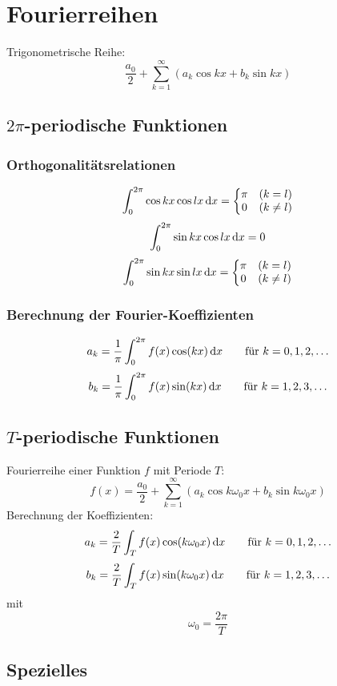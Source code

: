 \chapter{Fourierreihen}
Trigonometrische Reihe:
\[ \frac{a_0}{2} + \sum_{k=1}^{\infty}\left( a_k\cos kx + b_k\sin kx \right) \]

\section{$2\pi$-periodische Funktionen}
\subsection{Orthogonalitätsrelationen}
\[ \int_{0}^{2\pi}\cos kx\cos lx\,\mathrm{d} x = \left\lbrace \begin{matrix}
	\pi & (k=l) \\ 0 & (k\neq l) \end{matrix} \right. \]
\[ \int_{0}^{2\pi}\sin kx\cos lx\,\mathrm{d} x = 0 \]
\[ \int_{0}^{2\pi}\sin kx\sin lx\,\mathrm{d} x = \left\lbrace \begin{matrix}
	\pi & (k=l) \\ 0 & (k\neq l) \end{matrix} \right. \]
	
\subsection{Berechnung der Fourier-Koeffizienten}
\[ a_k = \frac{1}{\pi}\int_{0}^{2\pi}f(x)\cos(kx)\,\mathrm{d} x \qquad \text{für }k=0,1,2,\ldots  \]
\[ b_k = \frac{1}{\pi}\int_{0}^{2\pi}f(x)\sin(kx)\,\mathrm{d} x \qquad \text{für }k=1,2,3,\ldots  \]

\section{$T$-periodische Funktionen}
Fourierreihe einer Funktion $f$ mit Periode $T$:
\[ f(x) = \frac{a_0}{2} + \sum_{k=1}^{\infty}\left( a_k\cos k\omega_0x + b_k\sin k\omega_0x \right) \]
Berechnung der Koeffizienten:
\[ a_k = \frac{2}{T}\int_{T}f(x)\cos(k\omega_0x)\,\mathrm{d} x \qquad \text{für }k=0,1,2,\ldots  \]
\[ b_k = \frac{2}{T}\int_{T}f(x)\sin(k\omega_0x)\,\mathrm{d} x \qquad \text{für }k=1,2,3,\ldots  \]
mit
\[ \omega_0=\frac{2\pi}{T} \]

\section{Spezielles}

